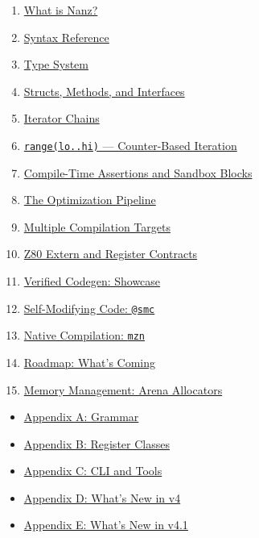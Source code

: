 \documentclass[
  11pt,
]{article}
\providecommand{\tightlist}{%
  \setlength{\itemsep}{0pt}\setlength{\parskip}{0pt}}
\begin{document}
\begin{enumerate}
\def\labelenumi{\arabic{enumi}.}
\tightlist
\item
  \hyperref[chapter-1-what-is-nanz]{What is Nanz?}
\item
  \hyperref[chapter-2-syntax-reference]{Syntax Reference}
\item
  \hyperref[chapter-3-type-system]{Type System}
\item
  \hyperref[chapter-4-structs-methods-and-interfaces]{Structs, Methods,
  and Interfaces}
\item
  \hyperref[chapter-5-iterator-chains]{Iterator Chains}
\item
  \hyperref[chapter-6-range-counter-based-iteration]{\texttt{range(lo..hi)}
  --- Counter-Based Iteration}
\item
  \hyperref[chapter-7-compile-time-assertions-and-sandbox-blocks]{Compile-Time
  Assertions and Sandbox Blocks}
\item
  \hyperref[chapter-8-the-optimization-pipeline]{The Optimization
  Pipeline}
\item
  \hyperref[chapter-9-multiple-compilation-targets]{Multiple Compilation
  Targets}
\item
  \hyperref[chapter-10-z80-extern-and-register-contracts]{Z80 Extern and
  Register Contracts}
\item
  \hyperref[chapter-11-verified-codegen-showcase]{Verified Codegen:
  Showcase}
\item
  \hyperref[chapter-12-self-modifying-code-smc]{Self-Modifying Code:
  \texttt{@smc}}
\item
  \hyperref[chapter-13-native-compilation-mzn]{Native Compilation:
  \texttt{mzn}}
\item
  \hyperref[chapter-14-roadmap-whats-coming]{Roadmap: What's Coming}
\item
  \hyperref[chapter-15-memory-management-arena-allocators]{Memory
  Management: Arena Allocators}
\end{enumerate}

\begin{itemize}
\tightlist
\item
  \hyperref[appendix-a-grammar]{Appendix A: Grammar}
\item
  \hyperref[appendix-b-register-classes]{Appendix B: Register Classes}
\item
  \hyperref[appendix-c-cli-and-tools]{Appendix C: CLI and Tools}
\item
  \hyperref[appendix-d-whats-new-in-v4]{Appendix D: What's New in v4}
\item
  \hyperref[appendix-e-whats-new-in-v41]{Appendix E: What's New in v4.1}
\end{itemize}
\end{document}
